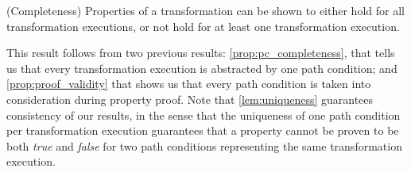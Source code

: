\begin{pf}

\end{pf}


\begin{proposition}{(Completeness) Properties of a transformation can be shown to either hold for all transformation executions, or not hold for at least one transformation execution.}
\label{prop:proof_completeness}
\end{proposition}
\begin{pf}
This result follows from two previous results: \cref{prop:pc_completeness}, that tells us that every transformation execution is abstracted by one path condition; and \cref{prop:proof_validity} that shows us that every path condition is taken into consideration during property proof. Note that \cref{lem:uniqueness} guarantees consistency of our results, in the sense that the uniqueness of one path condition per transformation execution guarantees that a property cannot be proven to be both \emph{true} and \emph{false} for two path conditions representing the same transformation execution.
\end{pf}
